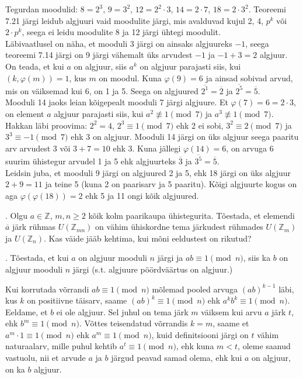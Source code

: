 \documentclass[a4paper, 10pt]{article}
\newcommand{\Z}{\mathbb{Z}}
\newcommand{\w}{\overline}
\begin{document}
\bigskip
Tegurdan moodulid: $8=2^3$, $9=3^2$, $12=2^2\cdot3$, $14=2\cdot7$, $18=2\cdot3^2$. Teoreemi 7.21 järgi leidub algjuuri vaid moodulite järgi, mis avalduvad kujul 2, 4, $p^k$ või $2\cdot p^k$, seega ei leidu moodulite 8 ja 12 järgi ühtegi moodulit.\\
\indent Läbivaatlusel on näha, et mooduli 3 järgi on ainsaks algjuureks $-1$, seega teoreemi 7.14 järgi on 9 järgi vähemalt üks arvudest $-1$ ja $-1+3=2$ algjuur. On teada, et kui $a$ on algjuur, siis $a^k$ on algjuur parajasti siis, kui $(k,\varphi(m))=1$, kus $m$ on moodul. Kuna $\varphi(9)=6$ ja ainsad sobivad arvud, mis on väiksemad kui 6, on 1 ja 5. Seega on algjuured $\w{2^1}=\w2$ ja $\w{2^5}=\w5$.\\
\indent Mooduli 14 jaoks leian kõigepealt mooduli 7 järgi algjuure. Et $\varphi(7)=6=2\cdot3$, on element $a$ algjuur parajasti siis, kui $a^2\not\equiv1\pmod7$ ja $a^3\not\equiv1\pmod7$. Hakkan läbi proovima: $2^2=4$, $2^3\equiv1\pmod7$ ehk 2 ei sobi, $3^2\equiv2\pmod7$ ja $3^3\equiv-1\pmod7$ ehk 3 on algjuur. Mooduli 14 järgi on üks algjuur seega paaritu arv arvudest 3 või $3+7=10$ ehk 3. Kuna jällegi $\varphi(14)=6$, on arvuga 6 suurim ühistegur arvudel 1 ja 5 ehk algjuurteks $\w3$ ja $\w{3^5}=\w5$.\\
\indent Leidsin juba, et mooduli 9 järgi on algjuured 2 ja 5, ehk 18 järgi on üks algjuur $2+9=11$ ja teine 5 (kuna 2 on paarisarv ja 5 paaritu). Kõigi algjuurte kogus on aga $\varphi(\varphi(18))=2$ ehk 5 ja 11 ongi kõik algjuured.
\bigskip

. Olgu $a\in\Z$, $m,n\geq 2$ kõik kolm paarikaupa ühistegurita. Tõestada, et elemendi $\overline{a}$ järk rühmas $U(\Z_{mn})$ on vähim ühiskordne tema järkudest rühmades $U(\Z_{m})$ ja $U(\Z_{n})$. Kas väide jääb kehtima, kui mõni eeldustest on rikutud?

\bigskip

. T\~oestada, et kui $a$ on algjuur mooduli $n$ j\"argi ja $ab\equiv 1\pmod{n}$, siis ka $b$ on algjuur mooduli $n$ j\"argi (s.t. algjuure pöördväärtus on algjuur.)

\bigskip
Kui korrutada võrrandi $ab\equiv1\pmod n$ mõlemad pooled arvuga $(ab)^{k-1}$ läbi, kus $k$ on positiivne täisarv, saame $(ab)^k\equiv1\pmod n$ ehk $a^kb^k\equiv1\pmod n$. Eeldame, et $b$ ei ole algjuur. Sel juhul on tema järk $m$ väiksem kui arvu $a$ järk $t$, ehk $b^m\equiv1\pmod n$. Võttes teisendatud võrrandis $k=m$, saame et $a^m\cdot1\equiv1\pmod n$ ehk $a^m\equiv1\pmod n$, kuid definitsiooni järgi on $t$ vähim naturaalarv, mille puhul kehtib $a^t\equiv1\pmod n$, ehk kuna $m<t$, oleme saanud vastuolu, nii et arvude $a$ ja $b$ järgud peavad samad olema, ehk kui $a$ on algjuur, on ka $b$ algjuur.
\bigskip
\end{document}
